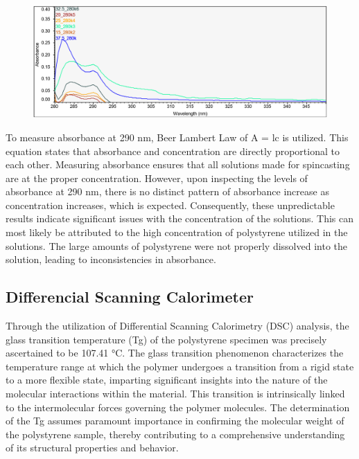 \documentclass[twocolumn]{article}
\begin{document}
                \begin{figure}
                    \centering
                    \includegraphics[width=0.8\columnwidth]{img/uvvis.png}
                    \label{fig:uv-vis}
                \end{figure}
                To measure absorbance at 290 nm, Beer Lambert Law of A = lc is utilized. This equation states that absorbance and concentration are directly proportional to each other. Measuring absorbance ensures that all solutions made for spincasting are at the proper concentration. However, upon inspecting the levels of absorbance at 290 nm, there is no distinct pattern of absorbance increase as concentration increases, which is expected. Consequently, these unpredictable results indicate significant issues with the concentration of the solutions. This can most likely be attributed to the high concentration of polystyrene utilized in the solutions. The large amounts of  polystyrene were not properly dissolved into the solution, leading to inconsistencies in absorbance. 

            \subsection{Differencial Scanning Calorimeter}
                Through the utilization of Differential Scanning Calorimetry (DSC) analysis, the glass transition temperature (Tg) of the polystyrene specimen was precisely ascertained to be 107.41 °C. The glass transition phenomenon characterizes the temperature range at which the polymer undergoes a transition from a rigid state to a more flexible state, imparting significant insights into the nature of the molecular interactions within the material. This transition is intrinsically linked to the intermolecular forces governing the polymer molecules\autocite{WOS:COUCHMAN}. The determination of the Tg assumes paramount importance in confirming the molecular weight of the polystyrene sample, thereby contributing to a comprehensive understanding of its structural properties and behavior.
\end{document}
